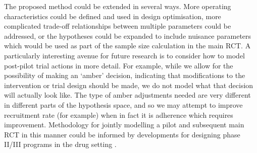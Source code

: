 \documentclass[AMA,STIX1COL]{WileyNJD-v2}
\begin{document}
The proposed method could be extended in several ways. More operating characteristics could be defined and used in design optimisation, more complicated trade-off relationships between multiple parameters could be addressed, or the hypotheses could be expanded to include nuisance parameters which would be used as part of the sample size calculation in the main RCT. A particularly interesting avenue for future research is to consider how  to model post-pilot trial actions in more detail. For example, while we allow for the possibility of making an `amber' decision, indicating that modifications to the intervention or trial design should be made, we do not model what that decision will actually look like. The type of amber adjustments needed are very different in different parts of the hypothesis space, and so we may attempt to improve recruitment rate (for example) when in fact it is adherence which requires improvement. Methodology for jointly modelling a pilot and subsequent main RCT in this manner could be informed by developments for designing phase II/III programs in the drug setting \cite{Stallard2012, Goette2015, Kirchner2015}.




\end{document}
